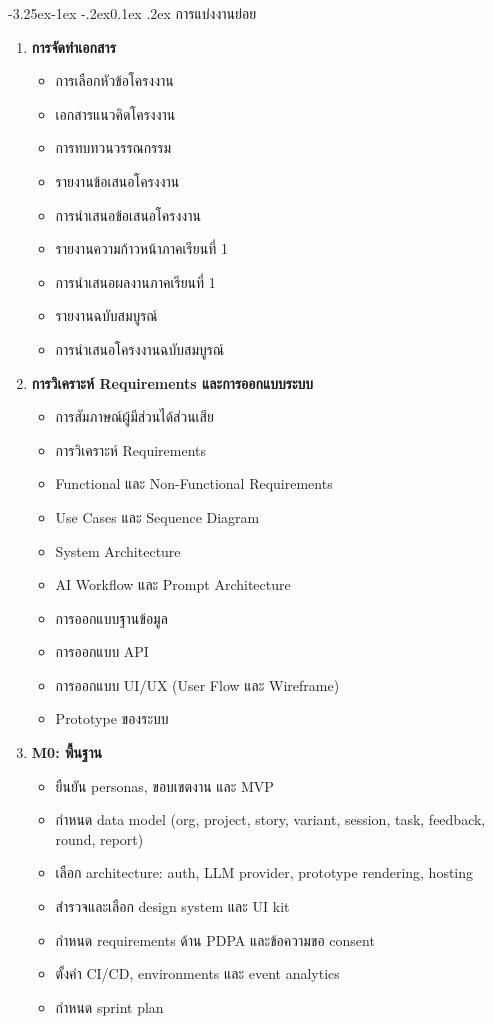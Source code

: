 \documentclass[a4paper,oneside]{cpe-thesis-th}
\makeatletter
\renewcommand\subsection{\@startsection{subsection}{2}{\z@}%
   {-3.25ex\@plus -1ex \@minus -.2ex}{0.1ex \@plus .2ex}%
   {\normalfont\thsz@subsection\bfseries}}
\makeatother
\begin{document}
\subsection{การแบ่งงานย่อย}
\begin{enumerate}
  \item \textbf{การจัดทำเอกสาร}
    \begin{itemize}
      \item การเลือกหัวข้อโครงงาน
      \item เอกสารแนวคิดโครงงาน
      \item การทบทวนวรรณกรรม
      \item รายงานข้อเสนอโครงงาน
      \item การนำเสนอข้อเสนอโครงงาน
      \item รายงานความก้าวหน้าภาคเรียนที่ 1
      \item การนำเสนอผลงานภาคเรียนที่ 1
      \item รายงานฉบับสมบูรณ์
      \item การนำเสนอโครงงานฉบับสมบูรณ์
    \end{itemize}

  \item \textbf{การวิเคราะห์ Requirements และการออกแบบระบบ}
    \begin{itemize}
      \item การสัมภาษณ์ผู้มีส่วนได้ส่วนเสีย
      \item การวิเคราะห์ Requirements
      \item Functional และ Non-Functional Requirements
      \item Use Cases และ Sequence Diagram
      \item System Architecture
      \item AI Workflow และ Prompt Architecture
      \item การออกแบบฐานข้อมูล
      \item การออกแบบ API
      \item การออกแบบ UI/UX (User Flow และ Wireframe)
      \item Prototype ของระบบ
    \end{itemize}

  \item \textbf{M0: พื้นฐาน}
    \begin{itemize}
      \item ยืนยัน personas, ขอบเขตงาน และ MVP
      \item กำหนด data model (org, project, story, variant, session, task, feedback, round, report)
      \item เลือก architecture: auth, LLM provider, prototype rendering, hosting
      \item สำรวจและเลือก design system และ UI kit
      \item กำหนด requirements ด้าน PDPA และข้อความขอ consent
      \item ตั้งค่า CI/CD, environments และ event analytics
      \item กำหนด sprint plan
    \end{itemize}


\end{enumerate}
\end{document}

